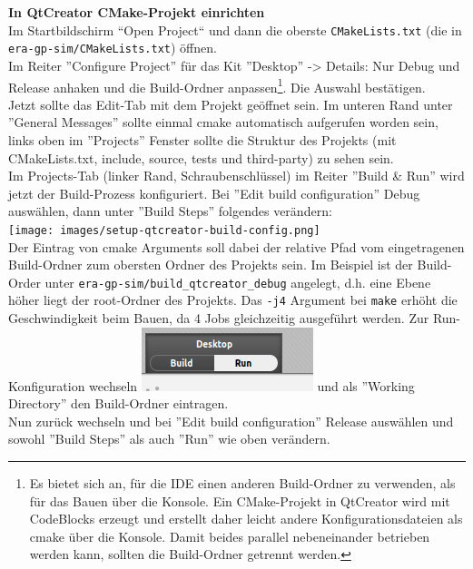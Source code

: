 \textbf{In QtCreator CMake-Projekt einrichten}\\
Im Startbildschirm ``Open Project`` und dann die oberste \texttt{CMakeLists.txt} (die in \texttt{era-gp-sim/CMakeLists.txt}) öffnen.\\
Im Reiter ''Configure Project'' für das Kit ''Desktop'' -> Details: Nur Debug und Release anhaken und die Build-Ordner anpassen\footnote{Es bietet sich an, für die IDE einen anderen Build-Ordner zu verwenden, als für das Bauen über die Konsole. Ein CMake-Projekt in QtCreator wird mit CodeBlocks erzeugt und erstellt daher leicht andere Konfigurationsdateien als cmake über die Konsole. Damit beides parallel nebeneinander betrieben werden kann, sollten die Build-Ordner getrennt werden.}. Die Auswahl bestätigen.\\
Jetzt sollte das Edit-Tab mit dem Projekt geöffnet sein. Im unteren Rand unter ''General Messages'' sollte einmal cmake automatisch aufgerufen worden sein, links oben im ''Projects'' Fenster sollte die Struktur des Projekts (mit CMakeLists.txt, include, source, tests und third-party) zu sehen sein.\\
Im Projects-Tab (linker Rand, Schraubenschlüssel) im Reiter ''Build \& Run'' wird jetzt der Build-Prozess konfiguriert.
Bei ''Edit build configuration'' Debug auswählen, dann unter ''Build Steps'' folgendes verändern:\\
\texttt{[image: images/setup-qtcreator-build-config.png]}\\
Der Eintrag von cmake Arguments soll dabei der relative Pfad vom eingetragenen Build-Ordner zum obersten Ordner des Projekts sein. Im Beispiel ist der Build-Order unter \texttt{era-gp-sim/build\_qtcreator\_debug} angelegt, d.h. eine Ebene höher liegt der root-Ordner des Projekts. Das \texttt{-j4} Argument bei \texttt{make} erhöht die Geschwindigkeit beim Bauen, da 4 Jobs gleichzeitig ausgeführt werden.
Zur Run-Konfiguration wechseln \includegraphics[scale=1.0]{images/setup-qtcreator-run-config.png} und als ''Working Directory'' den Build-Ordner eintragen.\\

Nun zurück wechseln und bei ''Edit build configuration'' Release auswählen und sowohl ''Build Steps'' als auch ''Run'' wie oben verändern.\\


